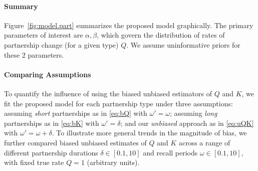 \paragraph{Summary}
Figure~\ref{fig:model.part} summarizes the proposed model graphically.
The primary parameters of interest are $\alpha, \beta$, which govern
the distribution of rates of partnership change (for a given type) $Q$.
We assume uninformative priors for these 2 parameters.
\paragraph{Comparing Assumptions}
To quantify the influence of using
the biased \vs unbiased estimators of $Q$ and $K$,
we fit the proposed model for each partnership type under three assumptions:
assuming \emph{short} partnerships as in \eqref{eq:bQ} with $\omega' = \omega$;
assuming \emph{long} partnerships as in \eqref{eq:bK} with $\omega' = \delta$; and
our \emph{unbiased} approach as in \eqref{eq:uQK} with $\omega' = \omega + \delta$.
To illustrate more general trends in the magnitude of bias,
we further compared biased \vs unbiased estimates of $Q$ and $K$ across a range of different
partnership durations $\delta \in [0.1, 10]$ and
recall periods $\omega \in [0.1, 10]$,
with fixed true rate $Q = 1$ (arbitrary units).
